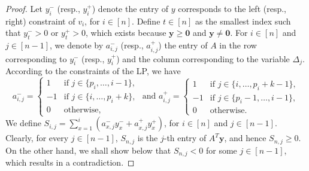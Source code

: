 \begin{proof}
Let $y_i^-$ (resp., $y_i^+$) denote the entry of $y$ corresponds to the left (resp., right) constraint of $v_i$, for $i \in [n]$.
Define $t \in [n]$ as the smallest index such that $y_t^- > 0$ or $y_t^+ > 0$, which exists because $\mathbf{y} \geq \mathbf{0}$ and $\mathbf{y} \neq \mathbf{0}$.
For $i \in [n]$ and $j \in [n-1]$, we denote by $a_{i,j}^-$ (resp., $a_{i,j}^+$) the entry of $A$ in the row corresponding to $y_i^-$ (resp., $y_i^+$) and the column corresponding to the variable $\Delta_j$.
According to the constraints of the LP, we have
\begin{equation*}
    a_{i,j}^- = \left\{
    \begin{array}{ll}
        1 & \text{if } j \in \{p_i,\dots,i-1\}, \\
        -1 & \text{if } j \in \{i,\dots,p_i+k\}, \\
        0 & \text{otherwise},
    \end{array}
    \right.
    \text{ and \ }
    a_{i,j}^+ = \left\{
    \begin{array}{ll}
        1 & \text{if } j \in \{i,\dots,p_i+k-1\}, \\
        -1 & \text{if } j \in \{p_i-1,\dots,i-1\}, \\
        0 & \text{otherwise}.
    \end{array}
    \right.
\end{equation*}
We define $S_{i,j} = \sum_{x=1}^i (a_{x,j}^- y_x^- + a_{x,j}^+ y_x^+)$, for $i \in [n]$ and $j \in [n-1]$.
Clearly, for every $j \in [n-1]$, $S_{n,j}$ is the $j$-th entry of $A^T \mathbf{y}$, and hence $S_{n,j} \geq 0$.
On the other hand, we shall show below that $S_{n,j} < 0$ for some $j \in [n-1]$, which results in a contradiction.


\end{proof}
